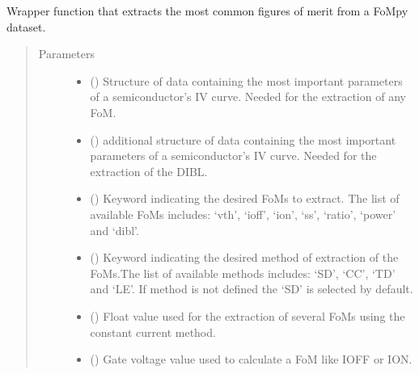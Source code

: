 \documentclass[letterpaper,10pt,english,openany, oneside]{sphinxmanual}
\begin{document}
\begin{fulllineitems}
\label{\detokenize{index:fompy.wrappers.extract}}
Wrapper function that extracts the most common figures of merit from a FoMpy dataset.
\begin{quote}\begin{description}
\item[{Parameters}] \leavevmode\begin{itemize}
\item {} 
 () \textendash{} Structure of data containing the most important parameters of a semiconductor’s IV curve.
Needed for the extraction of any FoM.

\item {} 
 () \textendash{} additional structure of data containing the most important parameters of a semiconductor’s IV curve.
Needed for the extraction of the DIBL.

\item {} 
 () \textendash{} Keyword indicating the desired FoMs to extract. The list of available FoMs includes:
‘vth’, ‘ioff’, ‘ion’, ‘ss’, ‘ratio’, ‘power’ and ‘dibl’.

\item {} 
 () \textendash{} Keyword indicating the desired method of extraction of the FoMs.The list of available methods includes:
‘SD’, ‘CC’, ‘TD’ and ‘LE’. If method is not defined the ‘SD’ is selected by default.

\item {} 
 (\sphinxstyleliteralemphasis{\sphinxupquote{, }}) \textendash{} Float value used for the extraction of several FoMs using the constant current method.

\item {} 
 () \textendash{} Gate voltage value used to calculate a FoM like IOFF or ION.


\end{itemize}
\end{description}
\end{quote}
\end{fulllineitems}
\end{document}
